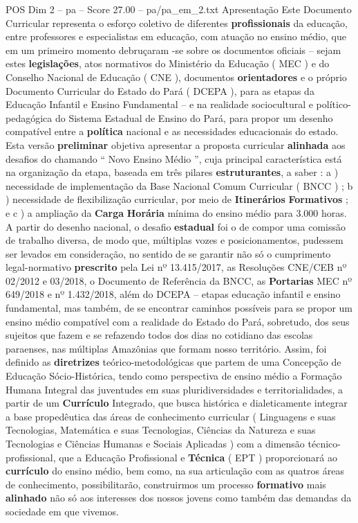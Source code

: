 \begin{textsample}{POS Dim 2 – pa – Score 27.00 – pa/pa\_em\_2.txt}  \label{ex:f2_pos_066}
Apresentação Este Documento Curricular representa o esforço coletivo de diferentes \textbf{profissionais} da educação, entre professores e especialistas em educação, com atuação no ensino médio, que em um primeiro momento debruçaram -se sobre os documentos oficiais – sejam estes \textbf{legislações}, atos normativos do Ministério da Educação ( MEC ) e do Conselho Nacional de Educação ( CNE ), documentos \textbf{orientadores} e o próprio Documento Curricular do Estado do Pará ( DCEPA ), para as etapas da Educação Infantil e Ensino Fundamental – e na realidade sociocultural e político-pedagógica do Sistema Estadual de Ensino do Pará, para propor um desenho compatível entre a \textbf{política} nacional e as necessidades educacionais do estado.
Esta versão \textbf{preliminar} objetiva apresentar a proposta curricular \textbf{alinhada} aos desafios do chamando “ Novo Ensino Médio ”, cuja principal característica está na organização da etapa, baseada em três pilares \textbf{estruturantes}, a saber : a ) necessidade de implementação da Base Nacional Comum Curricular ( BNCC ) ; b ) necessidade de flexibilização curricular, por meio de \textbf{Itinerários} \textbf{Formativos} ; e c ) a ampliação da \textbf{Carga} \textbf{Horária} mínima do ensino médio para 3.000 horas.
A partir do desenho nacional, o desafio \textbf{estadual} foi o de compor uma comissão de trabalho diversa, de modo que, múltiplas vozes e posicionamentos, pudessem ser levados em consideração, no sentido de se garantir não só o cumprimento legal-normativo \textbf{prescrito} pela Lei nº 13.415/2017, as Resoluções CNE/CEB nº 02/2012 e 03/2018, o Documento de Referência da BNCC, as \textbf{Portarias} MEC nº 649/2018 e nº 1.432/2018, além do DCEPA – etapas educação infantil e ensino fundamental, mas também, de se encontrar caminhos possíveis para se propor um ensino médio compatível com a realidade do Estado do Pará, sobretudo, dos seus sujeitos que fazem e se refazendo todos dos dias no cotidiano das escolas paraenses, nas múltiplas Amazônias que formam nosso território.
Assim, foi definido as \textbf{diretrizes} teórico-metodológicas que partem de uma Concepção de Educação Sócio-Histórica, tendo como perspectiva de ensino médio a Formação Humana Integral das juventudes em suas pluridiversidades e territorialidades, a partir de um \textbf{Currículo} Integrado, que busca histórica e dialeticamente integrar a base propedêutica das áreas de conhecimento curricular ( Linguagens e suas Tecnologias, Matemática e suas Tecnologias, Ciências da Natureza e suas Tecnologias e Ciências Humanas e Sociais Aplicadas ) com a dimensão técnico-profissional, que a Educação Profissional e \textbf{Técnica} ( EPT ) proporcionará ao \textbf{currículo} do ensino médio, bem como, na sua articulação com as quatros áreas de conhecimento, possibilitarão, construirmos um processo \textbf{formativo} mais \textbf{alinhado} não só aos interesses dos nossos jovens como também das demandas da sociedade em que vivemos.

\end{textsample}
